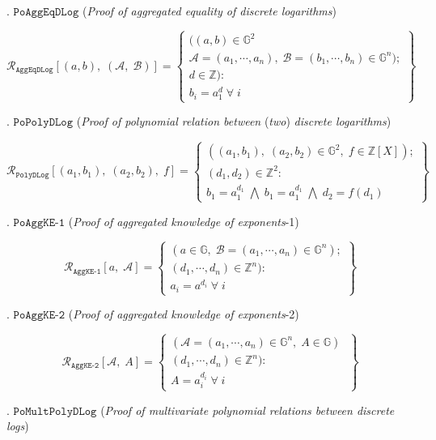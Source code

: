 \documentclass[11pt, lettersize, notitlepage, leqno, footskip=0.6cm]{article}
\newcommand{\bz}{\mathbb Z}
\newcommand{\ttt}{\texttt}
\newcommand{\mc}{\mathcal}
\newcommand{\mb}{\mathbb}
\newcommand{\noin}{\noindent}
\numberwithin{equation}{section}
\begin{document}
{\noin 2. $\ttt{PoAggEqDLog}$ (\textit{Proof of aggregated equality of discrete logarithms}) \vspace{-0.3cm}

\[
  \mc{R}_{\ttt{AggEqDLog}}[(a, b),\;(\mc{A},\;\mc{B})] = \left\{\begin{array}{l}
  	((a, b)\in\mb{G}^2\\
    \mc{A} = (a_1, \cdots, a_n),\;\mc{B} = (b_1,\cdots, b_n)\in\mb{G}^n);\\
    d\in\mb{Z}): \\
    b_i = a_1^{d} \;\forall\;i
  \end{array}\right\}
\]
 

\noin 3. $\ttt{PoPolyDLog}$ (\textit{Proof of polynomial relation between} (\textit{two}) \textit{discrete logarithms})\vspace{-0.3cm}

\[
  \mc{R}_{{\ttt{PolyDLog}}}[(a_1, b_1),\;(a_2,b_2),\;f] = \left\{\begin{array}{l}
    ((a_1, b_1), \; (a_2,b_2)\in\mb{G}^2,\;f\in\bz[X]);\\
    (d_1, d_2)\in\mb{Z}^2: \\
    b_1 = a_1^{d_1}\; \bigwedge\; b_1 = a_1^{d_1}\; \bigwedge \;d_2 = f(d_1)
  \end{array}\right\}
\]

\noin 4. $\ttt{PoAggKE-1}$ (\textit{Proof of aggregated knowledge of exponents}-1) \vspace{-0.3cm}

\[
  \mc{R}_{{\ttt{AggKE-1}}}[a,\; \mc{A}] = \left\{\begin{array}{l}
    (a\in\mb{G},\; \mc{B} = (a_1,\cdots, a_n)\in\mb{G}^n);\\ 
    (d_1,\cdots,d_n)\in\bz^n):  \\
    a_i = a^{d_i}\;\forall\; i
  \end{array}\right\}
\]

\noin 5. $\ttt{PoAggKE-2}$ (\textit{Proof of aggregated knowledge of exponents}-2) \vspace{-0.3cm}

\[
  \mc{R}_{{\ttt{AggKE-2}}}[\mc{A},\;A] = \left\{\begin{array}{l}
    (\mc{A} = (a_1,\cdots, a_n)\in \mb{G}^n,\; A\in\mb{G})\;\\ 
    (d_1,\cdots,d_n)\in\bz^n) :  \\
     A = a_i^{d_i}\;\forall\;  i
  \end{array}\right\}
\]

\noin 6. $\ttt{PoMultPolyDLog}$ (\textit{Proof of multivariate polynomial relations between discrete logs})\vspace{-0.3cm}

}
\end{document}
